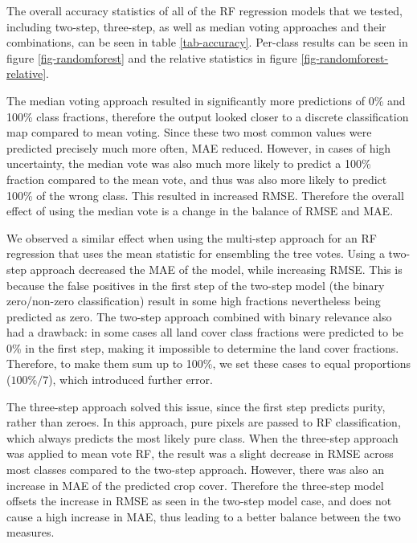 \documentclass[review,authoryear,3p]{elsarticle}
\begin{document}
The overall accuracy statistics of all of the \gls{RF} regression models that we tested, including two-step, three-step, as well as median voting approaches and their combinations, can be seen in table \ref{tab-accuracy}.
Per-class results can be seen in figure \ref{fig-randomforest} and the relative statistics in figure \ref{fig-randomforest-relative}.

The median voting approach resulted in significantly more predictions of 0\% and 100\% class fractions, therefore the output looked closer to a discrete classification map compared to mean voting.
Since these two most common values were predicted precisely much more often, \gls{MAE} reduced.
However, in cases of high uncertainty, the median vote was also much more likely to predict a 100\% fraction compared to the mean vote, and thus was also more likely to predict 100\% of the wrong class.
This resulted in increased \gls{RMSE}.
Therefore the overall effect of using the median vote is a change in the balance of \gls{RMSE} and \gls{MAE}.

We observed a similar effect when using the multi-step approach for an \gls{RF} regression that uses the mean statistic for ensembling the tree votes.
Using a two-step approach decreased the \gls{MAE} of the model, while increasing \gls{RMSE}.
This is because the false positives in the first step of the two-step model (the binary zero/non-zero classification) result in some high fractions nevertheless being predicted as zero.
The two-step approach combined with binary relevance also had a drawback: in some cases all land cover class fractions were predicted to be 0\% in the first step, making it impossible to determine the land cover fractions.
Therefore, to make them sum up to 100\%, we set these cases to equal proportions ($100\% / 7$), which introduced further error.

The three-step approach solved this issue, since the first step predicts purity, rather than zeroes.
In this approach, pure pixels are passed to \gls{RF} classification, which always predicts the most likely pure class.
When the three-step approach was applied to mean vote \gls{RF}, the result was a slight decrease in \gls{RMSE} across most classes compared to the two-step approach.
However, there was also an increase in \gls{MAE} of the predicted crop cover.
Therefore the three-step model offsets the increase in \gls{RMSE} as seen in the two-step model case, and does not cause a high increase in \gls{MAE}, thus leading to a better balance between the two measures.
\end{document}
